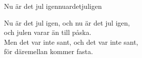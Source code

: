 \begin{song}{Nu är det jul igen}{nuardetjuligen}
\begin{vers}
\repopen Nu är det jul igen, och nu är det jul igen,\\
och julen varar än till påska. \repclose\\
\repopen Men det var inte sant, och det var inte sant,\\
för däremellan kommer fasta. \repclose\\
\end{vers}
\end{song}
